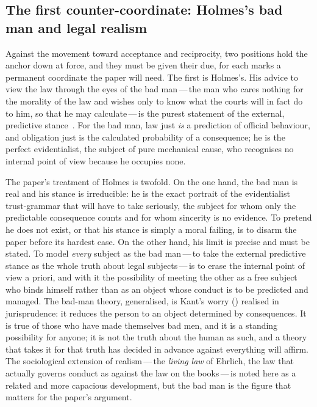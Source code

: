 \subsection{The first counter-coordinate: Holmes's bad man and legal realism}
\label{p13:sub:jur-holmes}

Against the movement toward acceptance and reciprocity, two positions hold the anchor down at force, and they must be given their due, for each marks a permanent coordinate the paper will need. The first is Holmes's. His advice to view the law through the eyes of the bad man\,---\,the man who cares nothing for the morality of the law and wishes only to know what the courts will in fact do to him, so that he may calculate\,---\,is the purest statement of the external, predictive stance~\parencite{holmes1897}. For the bad man, law just \emph{is} a prediction of official behaviour, and obligation just is the calculated probability of a consequence; he is the perfect evidentialist, the subject of pure mechanical cause, who recognises no internal point of view because he occupies none.

The paper's treatment of Holmes is twofold. On the one hand, the bad man is real and his stance is irreducible: he is the exact portrait of the evidentialist trust-grammar that  will have to take seriously, the subject for whom only the predictable consequence counts and for whom sincerity is no evidence. To pretend he does not exist, or that his stance is simply a moral failing, is to disarm the paper before its hardest case. On the other hand, his limit is precise and must be stated. To model \emph{every} subject as the bad man\,---\,to take the external predictive stance as the whole truth about legal subjects\,---\,is to erase the internal point of view a priori, and with it the possibility of meeting the other as a free subject who binds himself rather than as an object whose conduct is to be predicted and managed. The bad-man theory, generalised, is Kant's worry () realised in jurisprudence: it reduces the person to an object determined by consequences. It is true of those who have made themselves bad men, and it is a standing possibility for anyone; it is not the truth about the human as such, and a theory that takes it for that truth has decided in advance against everything  will affirm. The sociological extension of realism\,---\,the \emph{living law} of Ehrlich, the law that actually governs conduct as against the law on the books\,---\,is noted here as a related and more capacious development, but the bad man is the figure that matters for the paper's argument.

